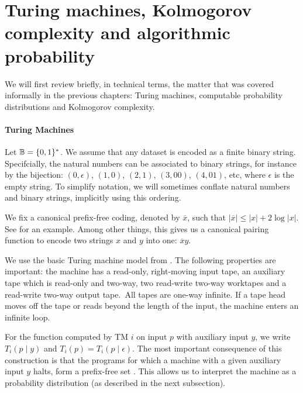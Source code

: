 \section{Turing machines, Kolmogorov complexity and  algorithmic probability}

We will first review briefly, in technical terms, the matter that was covered  informally in the previous chapters: Turing machines, computable probability distributions and Kolmogorov complexity. 

\paragraph{Turing Machines}

Let ${\mathbb B}= \{0, 1\}^*$. We assume that any dataset is encoded as a finite binary string. Specifcially, the natural numbers can be associated to binary strings, for instance by the bijection: $(0, \epsilon)$, $(1, 0)$, $(2, 1)$, $(3, 00)$, $(4, 01)$, etc, where $\epsilon$ is the empty string. To simplify notation, we will sometimes conflate natural numbers and binary strings, implicitly using this ordering.


We fix a canonical prefix-free coding, denoted by $\overline{x}$, such that $|\overline{x}| \leq |x| + 2 \log{|x|}$. See \cite[Example~1.11.13]{DBLP:books/daglib/0087328} for an example. Among other things, this gives us a canonical pairing function to encode two strings $x$ and $y$ into one: $\overline{x}y$.


We use the basic Turing machine model from \cite[Example~3.1.1]{DBLP:books/daglib/0087328}. The following properties are important: the machine has a read-only, right-moving input tape, an auxiliary tape which is read-only and two-way, two read-write two-way worktapes and a read-write two-way output tape.\footnotemark~All tapes are one-way infinite. If a tape head moves off the tape or reads beyond the length of the input, the machine enters an infinite loop. 


For the function computed by TM $i$ on input $p$ with auxiliary input $y$, we write $T_i(p\mid y)$ and $T_i(p) = T_i(p \mid \epsilon)$. The most important consequence of this construction is that the programs for which a machine with a given auxiliary input $y$ halts, form a prefix-free set \cite[Example~3.1.1]{DBLP:books/daglib/0087328}. This allows us to interpret the machine as a probability distribution (as described in the next subsection).

